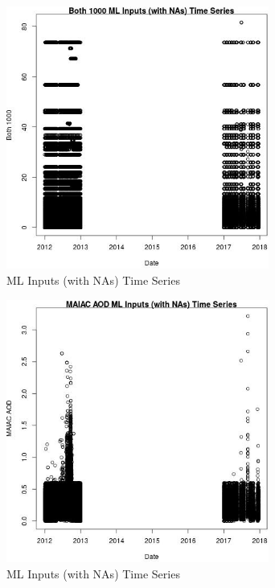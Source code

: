 \begin{figure} 
\centering  
\includegraphics[width=0.77\textwidth]{Code_Outputs/Report_ML_input_PM25_Step4_part_e_de_duplicated_aves_compiled_2019-05-14wNAs_Both_1000vDate.jpg} 
\caption{\label{fig:Report_ML_input_PM25_Step4_part_e_de_duplicated_aves_compiled_2019-05-14wNAsBoth_1000vDate}ML Inputs (with NAs) Time Series} 
\end{figure} 
 

\begin{figure} 
\centering  
\includegraphics[width=0.77\textwidth]{Code_Outputs/Report_ML_input_PM25_Step4_part_e_de_duplicated_aves_compiled_2019-05-14wNAs_MAIAC_AODvDate.jpg} 
\caption{\label{fig:Report_ML_input_PM25_Step4_part_e_de_duplicated_aves_compiled_2019-05-14wNAsMAIAC_AODvDate}ML Inputs (with NAs) Time Series} 
\end{figure} 
 

